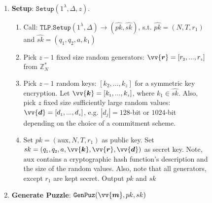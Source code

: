 


  \begin{figure}



\begin{boxedminipage}{\columnwidth}

\vspace{-2mm}
\

\begin{enumerate}

\item\textbf{Setup}: $\mathtt{Setup}(1^{\scriptscriptstyle\lambda}, \Delta,z)$.  
\begin{enumerate}

\item\label{call-RTLP-Setup} Call:  $\mathtt{TLP.Setup}(1^{\scriptscriptstyle\lambda}, \Delta)\rightarrow (\hat{pk},\hat{sk})$, s.t.  $\hat{pk}=(N,T,r_{\scriptscriptstyle 1})$ and $\hat{sk}=(q_{\scriptscriptstyle 1},q_{\scriptscriptstyle 2},a,k_{\scriptscriptstyle 1})$

\item Pick  $z-1$ fixed size  random generators: $\vv{\bm{r}}=[r_{\scriptscriptstyle 2},...,r_{\scriptscriptstyle z}]$ from $\mathbb{Z}^{\scriptscriptstyle *}_{ \scriptscriptstyle N}$


\item Pick  $z-1$ random keys: $[k_{\scriptscriptstyle 2},...,k_{\scriptscriptstyle z}]$ for a symmetric key encryption. Let $\vv{\bm{k}}=[k_{\scriptscriptstyle 1},...,k_{\scriptscriptstyle z}]$, where $k_{\scriptscriptstyle 1}\in \hat{sk}$. Also, pick $z$ fixed size sufficiently large random values: $\vv{\bm{d}}=[d_{\scriptscriptstyle 1},...,d_{\scriptscriptstyle z}]$, e.g. $|d_{\scriptscriptstyle j}|=128$-bit or $1024$-bit depending on the choice of a commitment scheme.  

\item Set $pk=( \text{aux},N,T, r_{\scriptscriptstyle 1})$ as  public key. Set $sk=(q_{\scriptscriptstyle 1},q_{\scriptscriptstyle 2},a, \vv{\bm{k}},\vv{\bm{r}},\vv{\bm{d}})$ as secret key. Note, $\text{aux}$ contains a cryptographic hash function's description and the size of the random values. Also,  note that  all generators, except $r_{\scriptscriptstyle 1}$ are kept secret. Output $pk$ and $sk$

\end{enumerate}
\item\label{Generate-Puzzle}\textbf{Generate Puzzle}: $\mathtt{GenPuz}(\vv{\bm{m}}, pk,sk)$ 



\end{enumerate}
\end{boxedminipage}
\end{figure}
